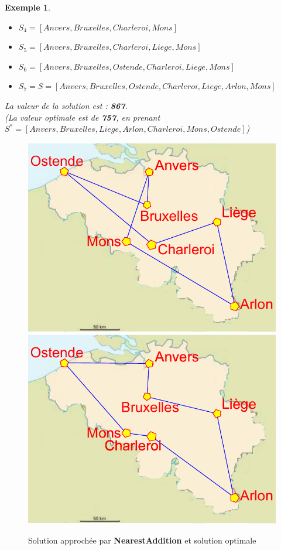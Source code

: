 \documentclass{article}
\newtheorem{exemple}{Exemple}[section]
\begin{document}
\begin{sffamily}
\begin{exemple}
\begin{itemize}
\item $S_4 = [Anvers,Bruxelles,Charleroi,Mons]$
\item $S_5 = [Anvers,Bruxelles,Charleroi,Liege,Mons]$
\item $S_6 = [Anvers,Bruxelles,Ostende,Charleroi,Liege,Mons]$
\item $S_7 = S = [Anvers,Bruxelles,Ostende,Charleroi,Liege,Arlon,Mons]$
\end{itemize}
La valeur de la solution est : \textbf{867}. \\
\textit{(La valeur optimale est de \textbf{757}, en prenant $S^* = [Anvers,Bruxelles,Liege,Arlon,Charleroi,Mons,Ostende]$)}
\end{exemple}
\begin{figure}[h!]
    \begin{center}
    \includegraphics[scale=0.5]{belgiqueNA.pdf}
    \includegraphics[scale=0.5]{belgiqueOPT.pdf}
    \caption{Solution approchée par \textbf{NearestAddition} et solution optimale}
    \end{center}
\end{figure}


\end{sffamily}
\end{document}

